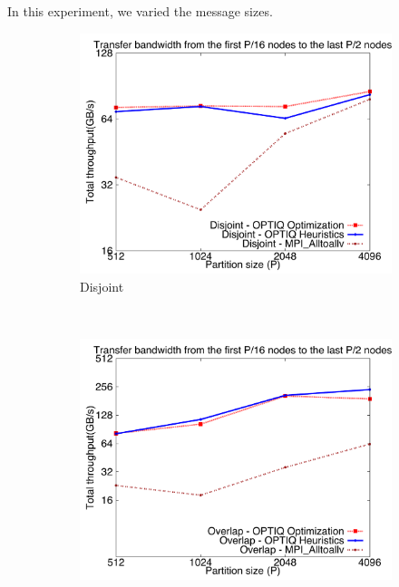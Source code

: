 In this experiment, we varied the message sizes.

\begin{figure}[!htbp]
        \centering
        \begin{subfigure}[b]{0.32\textwidth}
                \includegraphics[width=\textwidth]{figures/constantr_disjoint_msg.pdf}
                \caption{Disjoint}
                \label{fig:constantr_disjoint_msg}
        \end{subfigure}%
        ~ %
        \begin{subfigure}[b]{0.32\textwidth}
                \includegraphics[width=\textwidth]{figures/constantr_overlap_msg.pdf}

\end{subfigure}
\end{figure}
